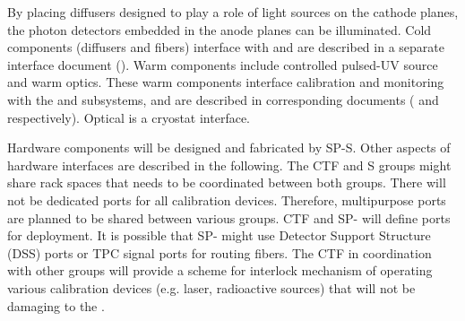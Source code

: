 By placing diffusers designed to play a role of light sources on the cathode planes, the photon detectors embedded in the anode planes can be illuminated.
Cold components (diffusers and fibers) interface with  and are described in a separate interface document (). 
Warm components include controlled pulsed-UV source and warm optics. These warm components interface calibration and monitoring  with the  and  subsystems, and are described in corresponding documents ( and  respectively).
Optical \fdth is a cryostat interface. 

Hardware components will be designed and fabricated by SP-S. Other aspects of hardware interfaces are described in the following. The CTF and S groups might share rack spaces that needs to be coordinated between both groups. There will not be dedicated ports for all calibration devices. Therefore, multipurpose ports are planned to be shared between various groups. CTF and SP- will define ports for deployment. It is possible that SP- might use Detector Support Structure (DSS) ports or TPC signal ports for routing fibers. The CTF in coordination with other groups will provide a scheme for interlock mechanism of operating various calibration devices (e.g. laser, radioactive sources) that will not be damaging to the . 


